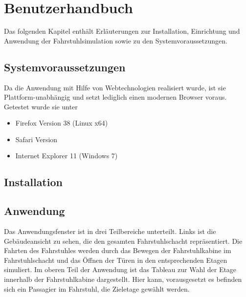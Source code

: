 \part{Benutzerhandbuch}
Das folgenden Kapitel enthält Erläuterungen zur Installation, Einrichtung und Anwendung der Fahrstuhlsimulation sowie zu den Systemvoraussetzungen.
\chapter{Systemvoraussetzungen}
Da die Anwendung mit Hilfe von Webtechnologien realisiert wurde, ist sie Plattform-unabhängig und setzt lediglich einen modernen Browser  voraus. Getestet wurde sie unter
\begin{itemize}
 \item Firefox Version 38 (Linux x64)
 \item Safari Version 
 \item Internet Explorer 11 (Windows 7) 
\end{itemize}
\chapter{Installation}
\chapter{Anwendung}
Das Anwendungsfenster ist in drei Teilbereiche unterteilt. Links ist die Gebäude\-ansicht zu sehen, die den gesamten Fahrstuhlschacht repräsentiert. Die Fahrten des Fahrstuhles werden durch das Bewegen der Fahrstuhlkabine im Fahrstuhlschacht und das Öffnen der Türen in den entsprechenden Etagen simuliert.
Im oberen Teil der Anwendung ist das Tableau zur Wahl der Etage innerhalb der Fahrstuhlkabine dargestellt. Hier kann, vorausgesetzt es befinden sich ein Passagier im Fahrstuhl, die Zieletage gewählt werden.


